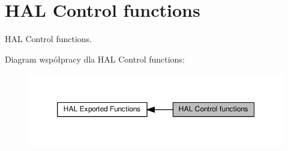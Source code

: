 \hypertarget{group___h_a_l___exported___functions___group2}{}\section{H\+AL Control functions}
\label{group___h_a_l___exported___functions___group2}


H\+AL Control functions.  


Diagram współpracy dla H\+AL Control functions\+:\nopagebreak
\begin{figure}[H]
\begin{center}
\leavevmode
\includegraphics[width=350pt]{group___h_a_l___exported___functions___group2}
\end{center}
\end{figure}
